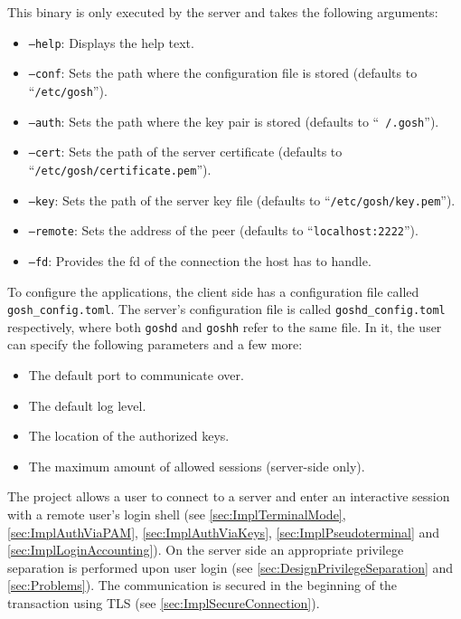 \documentclass[10pt,a4paper,titlepage,twoside,english,final]{zhawreprt}
\begin{document}
\begin{itemize}
This binary is only executed by the server and takes the following arguments:
\begin{itemize}
\item \texttt{--help}: Displays the help text.
\item \texttt{--conf}: Sets the path where the configuration file is stored (defaults to ``\texttt{/etc/gosh}'').
\item \texttt{--auth}: Sets the path where the key pair is stored (defaults to ``\texttt{~/.gosh}'').
\item \texttt{--cert}: Sets the path of the server certificate (defaults to ``\texttt{/etc/gosh/certifi\linebreak{}cate.pem}'').
\item \texttt{--key}: Sets the path of the server key file (defaults to ``\texttt{/etc/gosh/key.pem}'').
\item \texttt{--remote}: Sets the address of the peer (defaults to ``\texttt{localhost:2222}'').
\item \texttt{--fd}: Provides the \gls{fd} of the connection the host has to handle.
\end{itemize}
\end{itemize}

To configure the applications, the client side has a configuration file called \texttt{gosh\_config.toml}.
The server's configuration file is called \texttt{goshd\_config.toml} respectively, where both \texttt{goshd} and \texttt{goshh} refer to the same file.
In it, the user can specify the following parameters and a few more:
\begin{itemize}
\item The default port to communicate over.
\item The default log level.
\item The location of the authorized keys.
\item The maximum amount of allowed sessions (server-side only).
\end{itemize}

The project allows a user to connect to a server and enter an interactive session with a remote user's \gls{login} \gls{shell} (see \ref{sec:ImplTerminalMode}, \ref{sec:ImplAuthViaPAM}, \ref{sec:ImplAuthViaKeys}, \ref{sec:ImplPseudoterminal} and \ref{sec:ImplLoginAccounting}).
On the server side an appropriate privilege separation is performed upon user \gls{login} (see \ref{sec:DesignPrivilegeSeparation} and \ref{sec:Problems}).
The communication is secured in the beginning of the transaction using \gls{TLS} (see \ref{sec:ImplSecureConnection}).
\end{document}
